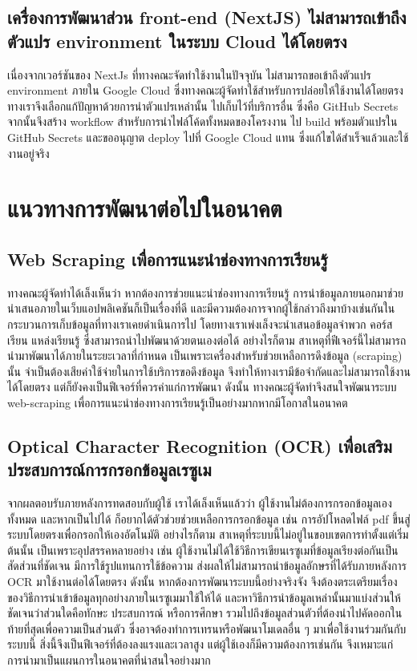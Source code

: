 \subsection{เครื่องการพัฒนาส่วน front-end (NextJS) ไม่สามารถเข้าถึงตัวแปร environment ในระบบ Cloud ได้โดยตรง}
\par{
    เนื่องจากเวอร์ชันของ NextJs ที่ทางคณะจัดทำใช้งานในปัจจุบัน ไม่สามารถขอเข้าถึงตัวแปร environment ภายใน Google Cloud ซึ่งทางคณะผู้จัดทำใช้สำหรับการปล่อยให้ใช้งานได้โดยตรง
    ทางเราจึงเลือกแก้ปัญหาด้วยการนำตัวแปรเหล่านั้น ไปเก็บไว้ที่บริการอื่น ซึ่งคือ GitHub Secrets จากนั้นจึงสร้าง workflow สำหรับการนำไฟล์โค้ดทั้งหมดของโครงงาน
    ไป build พร้อมตัวแปรใน GitHub Secrets และขออนุญาต deploy ไปที่ Google Cloud แทน ซึ่งแก้ไขได้สำเร็จแล้วและใช้งานอยู่จริง
}

\section{แนวทางการพัฒนาต่อไปในอนาคต}
\subsection{Web Scraping เพื่อการแนะนำช่องทางการเรียนรู้}
\par{
    ทางคณะผู้จัดทำได้เล็งเห็นว่า หากต้องการช่วยแนะนำช่องทางการเรียนรู้ การนำข้อมูลภายนอกมาช่วยนำเสนอภายในเว็บแอปพลิเคชันก็เป็นเรื่องที่ดี และมีความต้องการจากผู้ใช้กล่าวถึงมาบ้างเช่นกันในกระบวนการเก็บข้อมูลที่ทางเราเคยดำเนินการไป
    โดยทางเราเพ่งเล็งจะนำเสนอข้อมูลจำพวก คอร์สเรียน แหล่งเรียนรู้ ซึ่งสามารถนำไปพัฒนาด้วยตนเองต่อได้ อย่างไรก็ตาม สาเหตุที่ฟีเจอร์นี้ไม่สามารถนำมาพัฒนาได้ภายในระยะเวลาที่กำหนด
    เป็นเพราะเครื่องสำหรับช่วยเหลือการดึงข้อมูล (scraping) นั้น จำเป็นต้องเสียค่าใช้จ่ายในการใช้บริการขอดึงข้อมูล จึงทำให้ทางเรามีข้อจำกัดและไม่สามารถใช้งานได้โดยตรง แต่ก็ยังคงเป็นฟีเจอร์ที่ควรค่าแก่การพัฒนา ดังนั้น
    ทางคณะผู้จัดทำจึงสนใจพัฒนาระบบ web-scraping เพื่อการแนะนำช่องทางการเรียนรู้เป็นอย่างมากหากมีโอกาสในอนาคต
}
\subsection{Optical Character Recognition (OCR) เพื่อเสริมประสบการณ์การกรอกข้อมูลเรซูเม}
\label{subsec:Future Plan OCR}
\par{
    จากผลตอบรับภายหลังการทดสอบกับผู้ใช้ เราได้เล็งเห็นแล้วว่า ผู้ใช้งานไม่ต้องการกรอกข้อมูลเองทั้งหมด และหากเป็นไปได้ ก็อยากได้ตัวช่วยช่วยเหลือการกรอกข้อมูล
    เช่น การอัปโหลดไฟล์ pdf ขึ้นสู่ระบบโดยตรงเพื่อกรอกให้เองอัตโนมัติ อย่างไรก็ตาม สาเหตุที่ระบบนี้ไม่อยู่ในขอบเขตการทำตั้งแต่เริ่มต้นนั้น เป็นเพราะอุปสรรคหลายอย่าง
    เช่น ผู้ใช้งานไม่ได้ใช้วิธีการเขียนเรซูเมที่ข้อมูลเรียงต่อกันเป็นสัดส่วนที่ชัดเจน มีการใช้รูปแทนการใช้ข้อความ ส่งผลให้ไม่สามารถนำข้อมูลอักษรที่ได้รับภายหลังการ OCR มาใช้งานต่อได้โดยตรง
    ดังนั้น หากต้องการพัฒนาระบบนี้อย่างจริงจัง จึงต้องตระเตรียมเรื่องของวิธีการนำเข้าข้อมูลทุกอย่างภายในเรซูเมมาใช้ให้ได้ และหาวิธีการนำข้อมูลเหล่านั้นมาแบ่งส่วนให้ชัดเจนว่าส่วนใดคือทักษะ ประสบการณ์ หรือการศึกษา รวมไปถึงข้อมูลส่วนตัวที่ต้องนำไปคัดออกในท้ายที่สุดเพื่อความเป็นส่วนตัว
    ซึ่งอาจต้องทำการเทรนหรือพัฒนาโมเดลอื่น ๆ มาเพื่อใช้งานร่วมกันกับระบบนี้ สิ่งนี้จึงเป็นฟีเจอร์ที่ต้องลงแรงและเวลาสูง แต่ผู้ใช้เองก็มีความต้องการเช่นกัน จึงเหมาะแก่การนำมาเป็นแผนการในอนาคตที่น่าสนใจอย่างมาก
}

